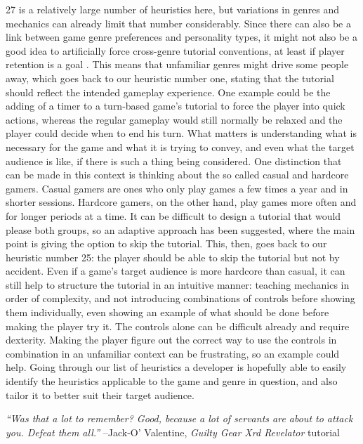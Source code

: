 27 is a relatively large number of heuristics here, but variations in genres and mechanics can already limit that number considerably. Since there can also be a link between game genre preferences and personality types, it might not also be a good idea to artificially force cross-genre tutorial conventions, at least if player retention is a goal \cite{Peever2012}. This means that unfamiliar genres might drive some people away, which goes back to our heuristic number one, stating that the tutorial should reflect the intended gameplay experience. One example could be the adding of a timer to a turn-based game's tutorial to force the player into quick actions, whereas the regular gameplay would still normally be relaxed and the player could decide when to end his turn. What matters is understanding what is necessary for the game and what it is trying to convey, and even what the target audience is like, if there is such a thing being considered. One distinction that can be made in this context is thinking about the so called casual and hardcore gamers. Casual gamers are ones who only play games a few times a year and in shorter sessions. Hardcore gamers, on the other hand, play games more often and for longer periods at a time. It can be difficult to design a tutorial that would please both groups, so an adaptive approach has been suggested, where the main point is giving the option to skip the tutorial. \cite{Moirn2016} This, then, goes back to our heuristic number 25: the player should be able to skip the tutorial but not by accident. Even if a game's target audience is more hardcore than casual, it can still help to structure the tutorial in an intuitive manner: teaching mechanics in order of complexity, and not introducing combinations of controls before showing them individually, even showing an example of what should be done before making the player try it. The controls alone can be difficult already and require dexterity. Making the player figure out the correct way to use the controls in combination in an unfamiliar context can be frustrating, so an example could help. \cite{Bycer2017} Going through our list of heuristics a developer is hopefully able to easily identify the heuristics applicable to the game and genre in question, and also tailor it to better suit their target audience.

\begin{displayquote}{\textit{``Was that a lot to remember?
Good, because a lot of servants are about to attack you.
Defeat them all.''}} --Jack-O' Valentine, \textit{Guilty Gear Xrd Revelator} tutorial
\end{displayquote}











